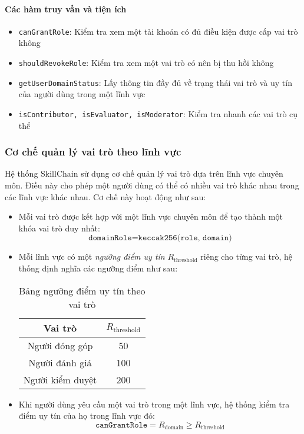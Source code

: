 \paragraph{Các hàm truy vấn và tiện ích}

\begin{itemize}
  \item \texttt{canGrantRole}: Kiểm tra xem một tài khoản có đủ điều kiện được cấp vai trò không
  \item \texttt{shouldRevokeRole}: Kiểm tra xem một vai trò có nên bị thu hồi không
  \item \texttt{getUserDomainStatus}: Lấy thông tin đầy đủ về trạng thái vai trò và uy tín của người dùng trong một lĩnh vực
  \item \texttt{isContributor, isEvaluator, isModerator}: Kiểm tra nhanh các vai trò cụ thể
\end{itemize}

\subsubsection{Cơ chế quản lý vai trò theo lĩnh vực}

Hệ thống SkillChain sử dụng cơ chế quản lý vai trò dựa trên lĩnh vực chuyên môn. Điều này cho phép một người dùng có thể có nhiều vai trò khác nhau trong các lĩnh vực khác nhau. Cơ chế này hoạt động như sau:

\begin{itemize}
  \item Mỗi vai trò được kết hợp với một lĩnh vực chuyên môn để tạo thành một khóa vai trò duy nhất:
        \[ \texttt{domainRole} = \texttt{keccak256(role, domain)} \]

  \item Mỗi lĩnh vực có một \textit{ngưỡng điểm uy tín} $R_{\text{threshold}}$ riêng cho từng vai trò, hệ thống định nghĩa các ngưỡng điểm như sau:
        \begin{table}[H]
          \centering
          \small
          \begin{tabular}{|c|c|}
            \hline
            \textbf{Vai trò} & $R_{\text{threshold}}$ \\ \hline
            Người đóng góp   & 50                     \\ \hline
            Người đánh giá   & 100                    \\ \hline
            Người kiểm duyệt & 200                    \\ \hline
          \end{tabular}
          \caption{Bảng ngưỡng điểm uy tín theo vai trò}
          \label{tab:role-reputation-threshold}
        \end{table}
  \item Khi người dùng yêu cầu một vai trò trong một lĩnh vực, hệ thống kiểm tra điểm uy tín của họ trong lĩnh vực đó:
        \[ \texttt{canGrantRole} = R_{\text{domain}} \geq R_{\text{threshold}} \]
\end{itemize}


